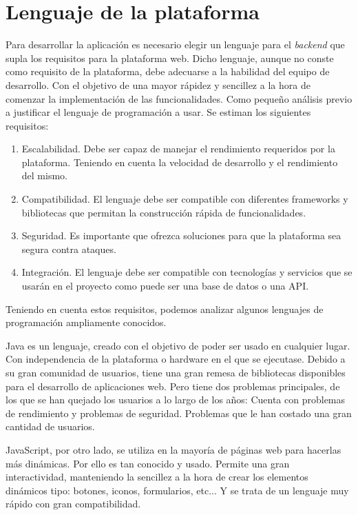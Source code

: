 \section{Lenguaje de la plataforma}
Para desarrollar la aplicación es necesario elegir un lenguaje para el \emph{backend} que supla los requisitos para la plataforma web. Dicho lenguaje, aunque no conste como requisito de la plataforma, debe adecuarse a la habilidad del equipo de desarrollo. Con el objetivo de una mayor rápidez y sencillez a la hora de comenzar la implementación de las funcionalidades. Como pequeño análisis previo a justificar el lenguaje de programación a usar. Se estiman los siguientes requisitos: 
\begin{enumerate}
    \item Escalabilidad. Debe ser capaz de manejar el rendimiento requeridos por la plataforma. Teniendo en cuenta la velocidad de desarrollo y el rendimiento del mismo.
    \item Compatibilidad. El lenguaje debe ser compatible con diferentes frameworks y bibliotecas que permitan la construcción rápida de funcionalidades.
    \item Seguridad. Es importante que ofrezca soluciones para que la plataforma sea segura contra ataques. 
    \item Integración. El lenguaje debe ser compatible con tecnologías y servicios que se usarán en el proyecto como puede ser una base de datos o una API.
\end{enumerate}

Teniendo en cuenta estos requisitos, podemos analizar algunos lenguajes de programación ampliamente conocidos. 

Java es un lenguaje, creado con el objetivo de poder ser usado en cualquier lugar. Con independencia de la plataforma o hardware en el que se ejecutase. Debido a su gran comunidad de usuarios, tiene una gran remesa de bibliotecas disponibles para el desarrollo de aplicaciones web. Pero tiene dos problemas principales, de los que se han quejado los usuarios a lo largo de los años: Cuenta con problemas de rendimiento y problemas de seguridad. Problemas que le han costado una gran cantidad de usuarios.

JavaScript, por otro lado, se utiliza en la mayoría de páginas web para hacerlas más dinámicas. Por ello es tan conocido y usado. Permite una gran interactividad, manteniendo la sencillez a la hora de crear los elementos dinámicos tipo: botones, iconos, formularios, etc... Y se trata de un lenguaje muy rápido con gran compatibilidad.

